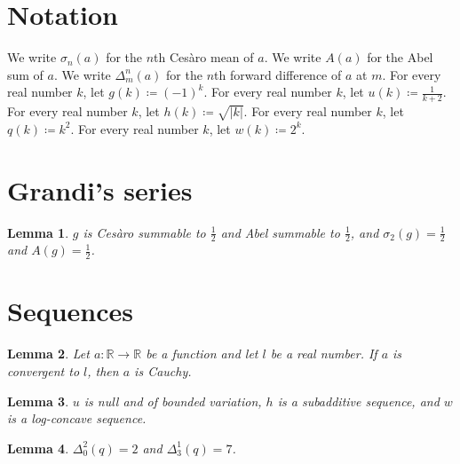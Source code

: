 \documentclass{article}
\newtheorem{lemma}{Lemma}
\begin{document}
\section{Notation}

We write $\sigma_n(a)$ for the $n$th Cesàro mean of $a$.
We write $A(a)$ for the Abel sum of $a$.
We write $\Delta^n_m(a)$ for the $n$th forward difference of $a$ at $m$.
For every real number $k$, let $g(k)\coloneqq(-1)^k$.
For every real number $k$, let $u(k)\coloneqq\frac{1}{k+2}$.
For every real number $k$, let $h(k)\coloneqq\sqrt{|k|}$.
For every real number $k$, let $q(k)\coloneqq k^2$.
For every real number $k$, let $w(k)\coloneqq 2^k$.

\section{Grandi's series}

\begin{lemma}\label{grandi}
$g$ is Cesàro summable to $\frac12$ and Abel summable to $\frac12$, and $\sigma_2(g)=\frac12$ and $A(g)=\frac12$.
\end{lemma}

\section{Sequences}

\begin{lemma}\label{cauchy}
Let $a:\mathbb{R}\to\mathbb{R}$ be a function and let $l$ be a real number. If $a$ is convergent to $l$, then $a$ is Cauchy.
\end{lemma}

\begin{lemma}\label{examples}
$u$ is null and of bounded variation, $h$ is a subadditive sequence, and $w$ is a log-concave sequence.
\end{lemma}

\begin{lemma}\label{difference}
$\Delta^2_0(q)=2$ and $\Delta^1_3(q)=7$.
\end{lemma}
\end{document}
